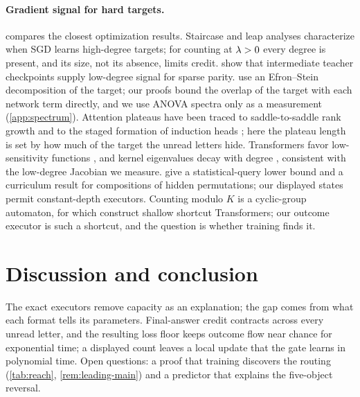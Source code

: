 \paragraph{Gradient signal for hard targets.}  compares the closest optimization results. Staircase and leap analyses
\citep{abbe2021staircase,abbe2022mergedstaircase,abbe2023sgd} characterize when SGD learns high-degree targets; for counting at
$\lambda>0$ every degree is present, and its size, not its absence, limits credit. \citet{panigrahi2025progressive} show that intermediate
teacher checkpoints supply low-degree signal for sparse parity. \citet{li2025noise} use an Efron--Stein decomposition of the target; our
proofs bound the overlap of the target with each network term directly, and we use ANOVA spectra only as a measurement
(\cref{app:spectrum}). Attention plateaus have been traced to saddle-to-saddle rank growth \citep{boixadsera2023rank} and to the staged formation of induction heads
\citep{bietti2023birth,reddy2024mechanistic,edelman2024evolution}; here the plateau length is set by how much of the target the unread letters hide.
Transformers favor low-sensitivity functions \citep{hahn2024sensitive}, and kernel eigenvalues decay with
degree \citep{yang2019spectral}, consistent with the low-degree Jacobian we measure. \citet{wang2025compositional} give a statistical-query lower bound and a curriculum result for
compositions of hidden permutations; our displayed states permit constant-depth executors. Counting modulo $K$ is a cyclic-group
automaton, for which \citet{liu2023automata} construct shallow shortcut Transformers; our outcome executor is such a shortcut, and the
question is whether training finds it.

\section{Discussion and conclusion}
\label{sec:conclusion}
\label{sec:discussion}

The exact executors remove capacity as an explanation; the gap comes from what each format tells its parameters. Final-answer credit
contracts across every unread letter, and the resulting loss floor keeps outcome flow near chance for exponential time; a displayed count
leaves a local update that the gate learns in polynomial time. Open questions: a proof that training discovers the routing (\cref{tab:reach},
\cref{rem:leading-main}) and a predictor that explains the five-object reversal.
